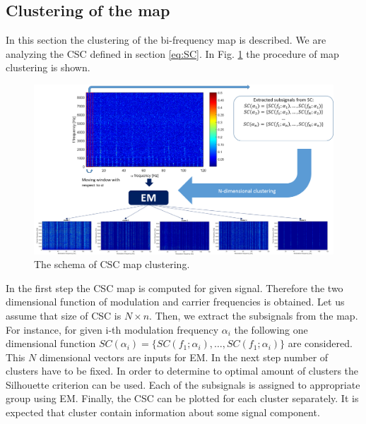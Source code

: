 \documentclass[11pt]{article}
\begin{document}
\subsection{Clustering of the map}
In this section the clustering of the bi-frequency map is described. We are analyzing the CSC defined in section \ref{eq:SC}. In Fig. \ref{fig:clustering} the procedure of  map clustering is shown. 
\begin{figure}[h!]
\begin{center}
\includegraphics[width=\textwidth]{wykresy/schemat1.png}
\caption{The schema of CSC map clustering.}
\label{fig:clustering}
\end{center}
\end{figure}
In the first step the CSC map is computed for given signal. Therefore the two dimensional function of modulation and carrier frequencies is obtained. Let us assume that size of CSC is $N \times n$.  Then, we extract the subsignals from the map. For instance, for given i-th modulation frequency $\alpha_i$ the following one dimensional function $SC(\alpha_i)=\{SC(f_1;\alpha_i),\dots ,SC(f_1;\alpha_i)\}$ are considered. This $N$ dimensional vectors are inputs for EM. In the next step number of clusters have to be fixed. In order to determine to optimal amount of clusters the Silhouette criterion can be used. Each of the subsignals  is assigned to appropriate group using EM. Finally, the CSC can be plotted for each cluster separately. It is expected that cluster contain information about some signal component. 


%
%
\end{document}
